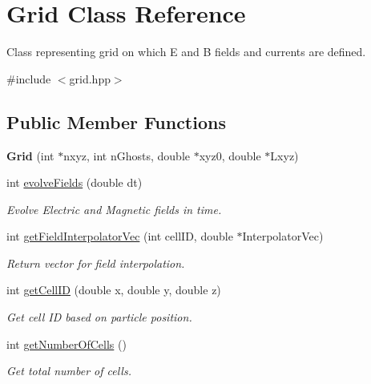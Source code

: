 \hypertarget{class_grid}{}\section{Grid Class Reference}
\label{class_grid}


Class representing grid on which E and B fields and currents are defined.  




{\ttfamily \#include $<$grid.\+hpp$>$}

\subsection*{Public Member Functions}
\begin{DoxyCompactItemize}
\item 
\hypertarget{class_grid_a696a4b0b7335bed4b9b712e72eb1034e}{}\label{class_grid_a696a4b0b7335bed4b9b712e72eb1034e} 
{\bfseries Grid} (int $\ast$nxyz, int n\+Ghosts, double $\ast$xyz0, double $\ast$Lxyz)
\item 
int \hyperlink{class_grid_ab1cc80fe3a856f09d59b51ef558764c3}{evolve\+Fields} (double dt)
\begin{DoxyCompactList}\small\item\em Evolve Electric and Magnetic fields in time. \end{DoxyCompactList}\item 
int \hyperlink{class_grid_a93ea3ff4d2e7bdc9b5c4cbe9fe604f76}{get\+Field\+Interpolator\+Vec} (int cell\+ID, double $\ast$Interpolator\+Vec)
\begin{DoxyCompactList}\small\item\em Return vector for field interpolation. \end{DoxyCompactList}\item 
int \hyperlink{class_grid_a7347c885ddb7abbcc9390b6fec4ba42b}{get\+Cell\+ID} (double x, double y, double z)
\begin{DoxyCompactList}\small\item\em Get cell ID based on particle position. \end{DoxyCompactList}\item 
\hypertarget{class_grid_a2bf56b3564559d4ac6533ee5610dc2ca}{}\label{class_grid_a2bf56b3564559d4ac6533ee5610dc2ca} 
int \hyperlink{class_grid_a2bf56b3564559d4ac6533ee5610dc2ca}{get\+Number\+Of\+Cells} ()
\begin{DoxyCompactList}\small\item\em Get total number of cells. \end{DoxyCompactList}\item 

\end{DoxyCompactItemize}
